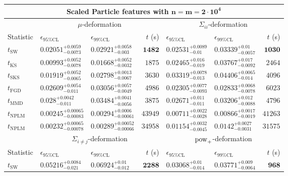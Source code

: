 \begin{tabular}{l|llr|llr}
	\toprule
	\multicolumn{7}{c}{{\bf Scaled Particle features with $\mathbf{n=m=2\cdot 10^{4}}$}} \\
	\toprule
	\multicolumn{1}{c}{} & \multicolumn{3}{c}{$\mu$-deformation} & \multicolumn{3}{c}{$\Sigma_{ii}$-deformation} \\
	Statistic & $\epsilon_{95\%\mathrm{CL}}$ & $\epsilon_{99\%\mathrm    {CL}}$ & $t$ (s) & $\epsilon_{95\%\mathrm{CL}}$ & $\epsilon_{99\%\mathrm{CL}}$ & $t$ (s) \\
	\midrule
	$t_{\mathrm{SW}}$ & $0.02051_{-0.0073}^{+0.0059}$ & $0.02921_{-0.003}^{+0.0058}$ & ${\mathbf{1482}}$ & $0.02531_{-0.01}^{+0.0089}$ & $0.03339_{-0.0057}^{+0.01}$ & ${\mathbf{1030}}$ \\
	$t_{\overline{\mathrm{KS}}}$ & ${\mathbf{0.00993_{-0.0078}^{+0.0052}}}$ & ${\mathbf{0.01668_{-0.0032}^{+0.0052}}}$ & $1875$ & $0.02465_{-0.019}^{+0.016}$ & $0.03767_{-0.0092}^{+0.017}$ & $2464$ \\
	$t_{\mathrm{SKS}}$ & $0.01919_{-0.0065}^{+0.0052}$ & $0.02798_{-0.0067}^{+0.0013}$ & $3630$ & $0.03319_{-0.013}^{+0.0078}$ & $0.04406_{-0.014}^{+0.0065}$ & $4096$ \\
	$t_{\mathrm{FGD}}$ & $0.02609_{-0.011}^{+0.0054}$ & $0.03056_{-0.0049}^{+0.0057}$ & $4986$ & ${\mathbf{0.02305_{-0.0093}^{+0.0077}}}$ & ${\mathbf{0.02833_{-0.0078}^{+0.0068}}}$ & $6023$ \\
	$t_{\mathrm{MMD}}$ & $0.028_{-0.011}^{+0.0042}$ & $0.03484_{-0.0056}^{+0.0041}$ & $3875$ & $0.02671_{-0.011}^{+0.011}$ & $0.03206_{-0.0088}^{+0.012}$ & $4796$ \\
\rowcolor{red!35}	$t_{\mathrm{NPLM}}$ & $0.00245_{-0.00083}^{+0.00065}$ & $0.00294_{-0.00061}^{+0.0006}$ & $43949$ & $0.00711_{-0.0028}^{+0.0022}$ & $0.00866_{-0.0019}^{+0.0017}$ & $41263$ \\
\rowcolor{blue!35}	$t_{\mathrm{NPLM}}$ & $0.00232_{-0.00078}^{+0.00065}$ & $0.00289_{-0.00066}^{+0.00052}$ & $34958$ & $0.01154_{-0.0045}^{+0.0032}$ & $0.0142_{-0.0031}^{+0.0027}$ & $31575$ \\
	\toprule
	\multicolumn{1}{c}{} & \multicolumn{3}{c}{$\Sigma_{i\neq j}$-deformation} & \multicolumn{3}{c}{$\rm{pow}_{+}$-deformation} \\
Statistic & $\epsilon_{95\%\mathrm{CL}}$ & $\epsilon_{99\%\mathrm{CL}}$ & $t$ (s) & $\epsilon_{95\%\mathrm{CL}}$ & $\epsilon_{99\%\mathrm{CL}}$ & $t$ (s) \\
	\midrule
	$t_{\mathrm{SW}}$ & $0.05216_{-0.021}^{+0.0084}$ & $0.06924_{-0.012}^{+0.01}$ & ${\mathbf{2288}}$ & $0.03068_{-0.014}^{+0.01}$ & $0.03771_{-0.0064}^{+0.009}$ & ${\mathbf{968}}$ \\

\end{tabular}
